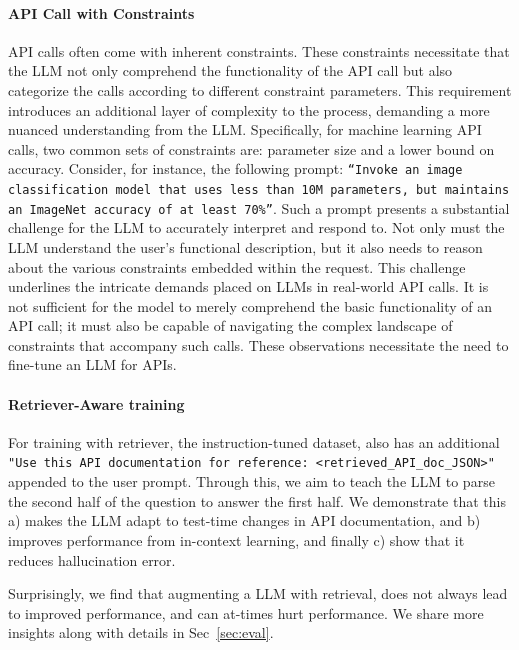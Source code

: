 \paragraph{API Call with Constraints} API calls often come with inherent constraints. These constraints necessitate that the LLM not only comprehend the functionality of the API call but also categorize the calls according to different constraint parameters. 
This requirement introduces an additional layer of complexity to the process, demanding a more nuanced understanding from the LLM.
Specifically, for machine learning API calls, two common sets of constraints are: parameter size and a lower bound on accuracy. Consider, for instance, the following prompt: \texttt{``Invoke an image classification model that uses less than 10M parameters, but maintains an ImageNet accuracy of at least 70\%''}. Such a prompt presents a substantial challenge for the LLM to accurately interpret and respond to. Not only must the LLM understand the user's functional description, but it also needs to reason about the various constraints embedded within the request. This challenge underlines the intricate demands placed on LLMs in real-world API calls. It is not sufficient for the model to merely comprehend the basic functionality of an API call; it must also be capable of navigating the complex landscape of constraints that accompany such calls. These observations necessitate the need to fine-tune an LLM for APIs.

\paragraph{Retriever-Aware training} For training with retriever, the instruction-tuned dataset, also has an additional \texttt{"Use this API documentation for reference: <retrieved\_API\_doc\_JSON>"} appended to the user prompt. Through this, we aim to teach the LLM to parse the second half of the question to answer the first half. We demonstrate that this a) makes the LLM adapt to test-time changes in API documentation, and b) improves performance  from in-context learning, and finally c) show that it reduces hallucination error. 

Surprisingly, we find that augmenting a LLM with retrieval, does not always lead to improved performance, and can at-times hurt performance. We share more insights along with details in Sec~\ref{sec:eval}.

